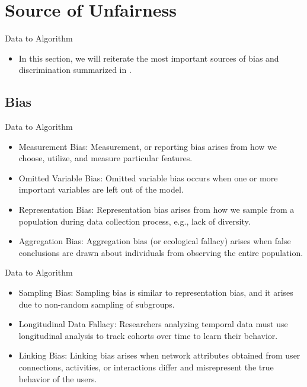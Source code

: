 \documentclass[10pt, xcolor=table,aspectratio=169]{beamer}
\begin{document}
\section{Source of Unfairness}

\begin{frame}{Data to Algorithm}
\begin{itemize}
	\item In this section, we will reiterate the most important sources of bias	and discrimination summarized in \cite{mehrabi2021survey}.
	
\end{itemize}

\end{frame}


\subsection{Bias}
\begin{frame}{Data to Algorithm}
	\begin{itemize}
		\item Measurement Bias: Measurement, or reporting bias arises from how we choose, utilize, and measure particular features.
		\item Omitted Variable Bias: Omitted variable bias occurs when one or more important variables	are left out of the model.
		\item Representation Bias: Representation bias arises from how we sample from a population during data collection process, e.g., lack of diversity.
		\item Aggregation Bias: Aggregation bias (or ecological fallacy) arises when false conclusions are drawn about individuals from observing the entire population.

	\end{itemize}

\end{frame}

\begin{frame}{Data to Algorithm}
	\begin{itemize}
		\item Sampling Bias: Sampling bias is similar to representation bias, and it arises due to non-random sampling of subgroups.
		\item Longitudinal Data Fallacy: Researchers analyzing temporal data must use longitudinal analysis to track cohorts over time to learn their behavior.
		\item Linking Bias: Linking bias arises when network attributes obtained from user connections, activities, or interactions differ and misrepresent the true behavior of the users.

	\end{itemize}

\end{frame}
\end{document}
